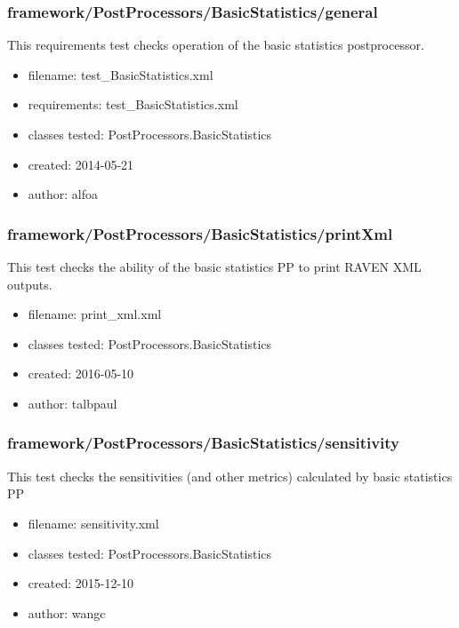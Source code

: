     \subsubsection{framework/PostProcessors/BasicStatistics/general}
      
      This requirements test checks operation of the basic statistics postprocessor.
    
      \begin{itemize}
          \item filename: test\_BasicStatistics.xml
          \item requirements: test\_BasicStatistics.xml
          \item classes tested: PostProcessors.BasicStatistics
          \item created: 2014-05-21
          \item author: alfoa
      \end{itemize}
    \subsubsection{framework/PostProcessors/BasicStatistics/printXml}
      
      This test checks the ability of the basic statistics PP to print RAVEN XML outputs.
    
      \begin{itemize}
          \item filename: print\_xml.xml
          \item classes tested: PostProcessors.BasicStatistics
          \item created: 2016-05-10
          \item author: talbpaul
      \end{itemize}
    \subsubsection{framework/PostProcessors/BasicStatistics/sensitivity}
      
      This test checks the sensitivities (and other metrics) calculated by basic statistics PP
    
      \begin{itemize}
          \item filename: sensitivity.xml
          \item classes tested: PostProcessors.BasicStatistics
          \item created: 2015-12-10
          \item author: wangc
      \end{itemize}
